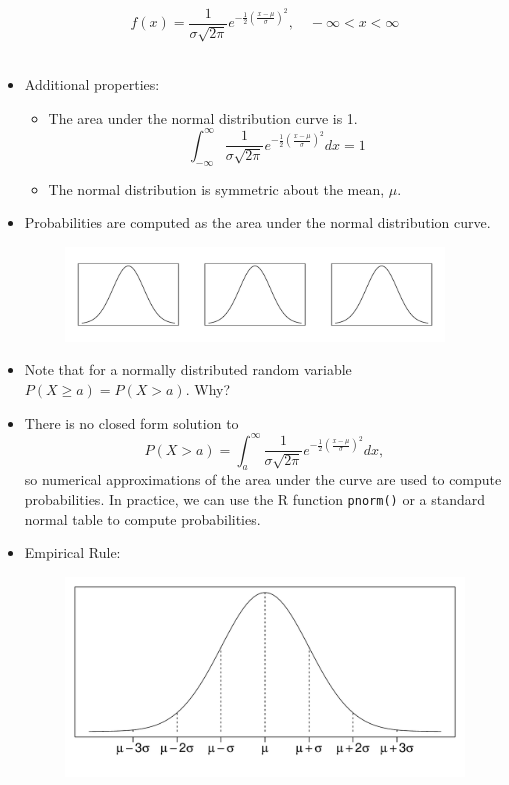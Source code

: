 \documentclass[fleqn, 11pt]{article}
\begin{document}
\begin{itemize}
$$f(x) = \frac{1}{\sigma \sqrt{2 \pi}} e^{-\frac{1}{2} \left( \frac{x-\mu}{\sigma} \right) ^2}, \quad -\infty < x < \infty$$
\
\item Additional properties:
\begin{itemize}
\item The area under the normal distribution curve is 1.
$$\int_{-\infty}^{\infty} \frac{1}{\sigma \sqrt{2 \pi}} e^{-\frac{1}{2} \left( \frac{x-\mu}{\sigma} \right) ^2} dx = 1$$
\item The normal distribution is symmetric about the mean, $\mu$. 
\end{itemize}
\end{itemize}
\clearpage

\begin{itemize}
\item Probabilities are computed as the area under the normal distribution curve.
\begin{figure}[ht]
\includegraphics[width=0.95\textwidth]{figure/norm3.pdf}
\end{figure}
\item Note that for a normally distributed random variable $P(X \geq a ) = P(X > a)$.  Why?
\vspace{35pt}
\item There is no closed form solution to 
$$P(X>a) = \int_a^{\infty} \frac{1}{\sigma \sqrt{2 \pi}} e^{-\frac{1}{2} \left( \frac{x-\mu}{\sigma} \right) ^2}dx,$$
so numerical approximations of the area under the curve are used to compute probabilities.  In practice, we can use the R function \texttt{pnorm()} or a standard normal table to compute probabilities.
\item Empirical Rule:
\begin{figure}[ht]
\includegraphics[scale=0.45]{figure/empirical.pdf}

\end{figure}
\end{itemize}
\end{document}
